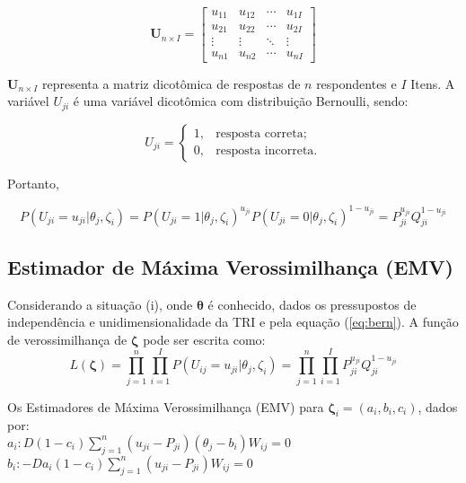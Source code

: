 \[ \textbf{U}_{n\times I} =  
\begin{bmatrix}
	u_{11} & u_{12} & \cdots & u_{1I} \\
	u_{21} & u_{22} & \cdots & u_{2I} \\
	\vdots & \vdots & \ddots & \vdots\\
	u_{n1} & u_{n2} & \cdots & u_{nI}
\end{bmatrix}
\]

\noindent $\textbf{U}_{n\times I}$ representa a matriz dicotômica de respostas de $ n $ respondentes e $ I $ Itens. A variável $U_{ji}$ é uma variável dicotômica com distribuição Bernoulli, sendo:

\[U_{ji} =    \begin{cases}
	
	  1, & \mbox{resposta correta;}  \\
	
	  0, & \mbox{resposta incorreta.}
	
\end{cases}
\]

Portanto,  

\begin{equation} \label{eq:bern}
P(U_{ji} = u_{ji}|\theta_j, \zeta_i) = P(U_{ji} = 1|\theta_j, \zeta_i)^{u_{ji}}
P(U_{ji} = 0|\theta_j, \zeta_i)^{1 - u_{ji}} = P_{ji}^{u_{ji}}Q_{ji}^{1-u_{ji}}
\end{equation}

\subsection{Estimador de Máxima Verossimilhança (EMV)}

Considerando a situação (i), onde $ \boldsymbol{\theta} $ é conhecido, dados os pressupostos de independência e unidimensionalidade da TRI e pela equação (\ref{eq:bern}). A função de verossimilhança de  $ \boldsymbol{\zeta} $ pode ser escrita como:
\[
L(\boldsymbol{\zeta}) =  \prod_{j=1}^{n}\prod_{i=1}^{I}P(U_{ij} = u_{ji}|\theta_j, \zeta_i) = \prod_{j=1}^{n}\prod_{i=1}^{I}P_{ji}^{u_{ji}}Q_{ji}^{1-u_{ji}}
\]

Os Estimadores de Máxima Verossimilhança (EMV) para $ \boldsymbol{\zeta}_i = (a_i, b_i , c_i )$, dados por:\\

\noindent $
	a_i: D(1 - c_i)\sum_{j=1}^{n}(u_{ji} - P_{ji})(\theta_j - b_i)W_{ij} = 0
$\\

\noindent $
	b_i: -Da_i(1 - c_i)\sum_{j=1}^{n}(u_{ji} - P_{ji})W_{ij} = 0
$\\

